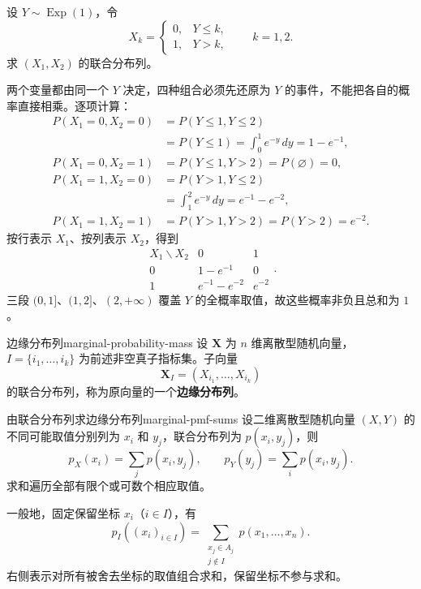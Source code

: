 \begin{example}[指数随机变量经阈值变换得到的联合分布列]
设 $Y\sim\operatorname{Exp}(1)$，令
\[
X_k=
\begin{cases}
0,&Y\leq k,\\
1,&Y>k,
\end{cases}
\qquad k=1,2.
\]
求 $(X_1,X_2)$ 的联合分布列。

两个变量都由同一个 $Y$ 决定，四种组合必须先还原为 $Y$ 的事件，不能把各自的概率直接相乘。逐项计算：
\begin{align*}
P(X_1=0,X_2=0)
&=P(Y\leq1,Y\leq2)\\
&=P(Y\leq1)=\int_0^1e^{-y}\,dy
=1-e^{-1},\\
P(X_1=0,X_2=1)
&=P(Y\leq1,Y>2)=P(\varnothing)=0,\\
P(X_1=1,X_2=0)
&=P(Y>1,Y\leq2)\\
&=\int_1^2e^{-y}\,dy=e^{-1}-e^{-2},\\
P(X_1=1,X_2=1)
&=P(Y>1,Y>2)=P(Y>2)=e^{-2}.
\end{align*}
按行表示 $X_1$、按列表示 $X_2$，得到
\[
\begin{array}{c|cc}
X_1\backslash X_2&0&1\\ \hline
0&1-e^{-1}&0\\
1&e^{-1}-e^{-2}&e^{-2}
\end{array}.
\]
三段 $(0,1]$、$(1,2]$、$(2,+\infty)$ 覆盖 $Y$ 的全概率取值，故这些概率非负且总和为 $1$。
\end{example}

\begin{mydefinition}{边缘分布列}{marginal-probability-mass}
设 $\boldsymbol X$ 为 $n$ 维离散型随机向量，$I=\{i_1,\ldots,i_k\}$ 为前述非空真子指标集。子向量
\[
\boldsymbol X_I=(X_{i_1},\ldots,X_{i_k})
\]
的联合分布列，称为原向量的一个\textbf{边缘分布列}。
\end{mydefinition}

\begin{proposition}{由联合分布列求边缘分布列}{marginal-pmf-sums}
设二维离散型随机向量 $(X,Y)$ 的不同可能取值分别列为 $x_i$ 和 $y_j$，联合分布列为 $p(x_i,y_j)$，则
\[
p_X(x_i)=\sum_jp(x_i,y_j),\qquad
p_Y(y_j)=\sum_ip(x_i,y_j).
\]
求和遍历全部有限个或可数个相应取值。

一般地，固定保留坐标 $x_i$（$i\in I$），有
\[
p_I((x_i)_{i\in I})
=\sum_{\substack{x_j\in A_j\\j\notin I}}
p(x_1,\ldots,x_n).
\]
右侧表示对所有被舍去坐标的取值组合求和，保留坐标不参与求和。
\end{proposition}

